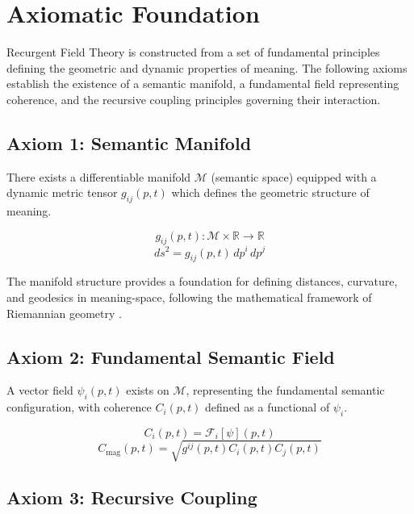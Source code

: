 \chapter{Axiomatic Foundation}

Recurgent Field Theory is constructed from a set of fundamental principles defining the geometric and dynamic properties of meaning. The following axioms establish the existence of a semantic manifold, a fundamental field representing coherence, and the recursive coupling principles governing their interaction.

\section{Axiom 1: Semantic Manifold}

There exists a differentiable manifold \(\mathcal{M}\) (semantic space) equipped with a dynamic metric tensor \(g_{ij}(p,t)\) which defines the geometric structure of meaning.

\begin{equation}
g_{ij}(p,t) : \mathcal{M} \times \mathbb{R} \rightarrow \mathbb{R}
\end{equation}
\begin{equation}
ds^2 = g_{ij}(p,t) \, dp^i \, dp^j
\end{equation}

The manifold structure provides a foundation for defining distances, curvature, and geodesics in meaning-space, following the mathematical framework of Riemannian geometry \autocite{Riemann1868}.

\section{Axiom 2: Fundamental Semantic Field}

A vector field \(\psi_i(p,t)\) exists on \(\mathcal{M}\), representing the fundamental semantic configuration, with coherence \(C_i(p,t)\) defined as a functional of \(\psi_i\).

\begin{equation}
C_i(p,t) = \mathcal{F}_i[\psi](p,t)
\end{equation}
\begin{equation}
C_{\text{mag}}(p,t) = \sqrt{g^{ij}(p,t) C_i(p,t) C_j(p,t)}
\end{equation}

\section{Axiom 3: Recursive Coupling}

